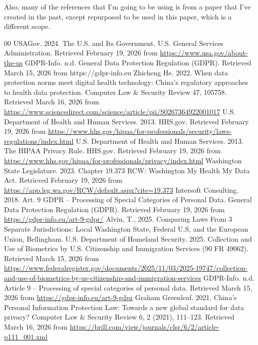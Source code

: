 \documentclass[conference]{IEEEtran}
\begin{document}
Also, many of the references that I'm going to be using is from a paper that I've created in the past, except repurposed to be used in this paper, which is a different scope.


\begin{thebibliography}{00}
 USAGov. 2024. The U.S. and Its Government. U.S. General Services Administration. Retrieved February 19, 2026 from \url{https://www.usa.gov/about-the-us}
 GDPR-Info. n.d. General Data Protection Regulation (GDPR). Retrieved March 15, 2026 from https://gdpr-info.eu
 Zhicheng He. 2022. When data protection norms meet digital health technology: China's regulatory approaches to health data protection. Computer Law \& Security Review 47, 105758. Retrieved March 16, 2026 from \url{https://www.sciencedirect.com/science/article/pii/S0267364922001017}
 U.S. Department of Health and Human Services. 2013. HHS.gov. Retrieved February 19, 2026 from \url{https://www.hhs.gov/hipaa/for-professionals/security/laws-regulations/index.html}
 U.S. Department of Health and Human Services. 2013. The HIPAA Privacy Rule. HHS.gov. Retrieved February 19, 2026 from \url{https://www.hhs.gov/hipaa/for-professionals/privacy/index.html}
 Washington State Legislature. 2023. Chapter 19.373 RCW: Washington My Health My Data Act. Retrieved February 19, 2026 from \url{https://app.leg.wa.gov/RCW/default.aspx?cite=19.373}
 Intersoft Consulting. 2018. Art. 9 GDPR – Processing of Special Categories of Personal Data. General Data Protection Regulation (GDPR). Retrieved February 19, 2026 from \url{https://gdpr-info.eu/art-9-gdpr/}
 Alvin, T., 2025. Comparing Laws From 3 Separate Jurisdictions: Local
Washington State, Federal U.S, and the European Union, Bellingham. 
 U.S. Department of Homeland Security. 2025. Collection and Use of Biometrics by U.S. Citizenship and Immigration Services (90 FR 49062). Retrieved March 15, 2026 from \url{https://www.federalregister.gov/documents/2025/11/03/2025-19747/collection-and-use-of-biometrics-by-us-citizenship-and-immigration-services}
 GDPR-Info. n.d. Article 9 – Processing of special categories of personal data. Retrieved March 15, 2026 from \url{https://gdpr-info.eu/art-9-gdpr}
 Graham Greenleaf. 2021. China’s Personal Information Protection Law: Towards a new global standard for data privacy? Computer Law \& Security Review 6, 2 (2021), 111–123. Retrieved March 16, 2026 from \url{https://brill.com/view/journals/clsr/6/2/article-p111_001.xml}

\end{thebibliography}
\vspace{12pt}
\end{document}
